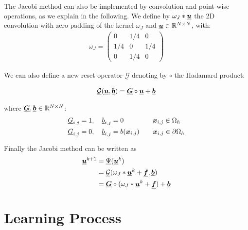 \documentclass{rescience} %
\begin{document}
The Jacobi method can also be implemented by convolution and point-wise operations, as we explain in the following. We define by $\omega_J \ast \underline{{\bm{u}}}$ the 2D convolution with zero padding of the kernel $\omega_J$ and $\underline{{\bm{u}}} \in {\mathbb{R}}^{N\times N}$, with:
\begin{align*}
\omega_{J} = \left (
 \begin{smallmatrix}
0 & 1/4 & 0 \\
1/4 & 0 & 1/4 \\
0 & 1/4 & 0
\end{smallmatrix}
\right )
\end{align*}

We can also define a new reset operator $\underline{\mathcal{G}}$ denoting by $\circ$ the Hadamard product:

\begin{equation*}
    \underline{\mathcal{G}}(\underline{{\bm{u}}}, \underline{{\bm{b}}}) = \underline{{\bm{G}}} \circ \underline{{\bm{u}}} + \underline{{\bm{b}}}
\end{equation*}

where $\underline{{\bm{G}}},\underline{{\bm{b}}} \in {\mathbb{R}}^{N\times N}$:
\begin{align*}
    \underline{{G}}_{i,j} &= 1, \quad \underline{{b}}_{i,j} = 0 \quad \; \quad  \qquad {\bm{x}}_{i,j}\in \Omega_h \\
    \underline{{G}}_{i,j} &= 0, \quad \underline{{b}}_{i,j} = b({\bm{x}}_{i,j})  \qquad {\bm{x}}_{i,j}\in \partial\Omega_h
\end{align*}

Finally the Jacobi method can be written as 
\begin{align*}
\underline{{\bm{u}}}^{k+1} &= \underline{\Psi}(\underline{{\bm{u}}}^k)\\
                      &=\underline{\mathcal{G}}(\omega_J \ast \underline{{\bm{u}}}^k + \underline{{\bm{f}}}, \underline{{\bm{b}}})\\
                      &= \underline{{\bm{G}}}\circ(\omega_J \ast \underline{{\bm{u}}}^k + \underline{{\bm{f}}}) + \underline{{\bm{b}}}
\end{align*}

\section{Learning Process}
\end{document}
